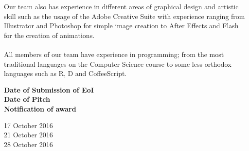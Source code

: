 \documentclass[11pt, oneside]{article}
\begin{document}
Our team also has experience in different areas of graphical design and artistic skill such as the usage of the Adobe Creative Suite with experience ranging from Illustrator and Photoshop for simple image creation to After Effects and Flash for the creation of animations.\\ \\

All members of our team have experience in programming; from the most traditional languages on the Computer Science course to some less orthodox languages such as R, D and CoffeeScript.\\

\begin{minipage}[t]{0.5\textwidth}
    \textbf{Date of Submission of EoI}\\
    \textbf{Date of Pitch}\\
    \textbf{Notification of award}\\

\end{minipage}
\begin{minipage}[t]{0.5\textwidth}
    17 October 2016\\
    21 October 2016\\
    28 October 2016\\
\end{minipage}
\end{document}
